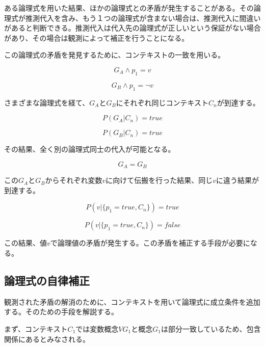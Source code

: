 \documentclass[12pt]{article}
\begin{document}
ある論理式を用いた結果、ほかの論理式との矛盾が発生することがある。その論理式が推測代入を含み、もう１つの論理式が含まない場合は、推測代入に間違いがあると判断できる。推測代入は代入先の論理式が正しいという保証がない場合があり、その場合は観測によって補正を行うことになる。

この論理式の矛盾を発見するために、コンテキストの一致を用いる。

\begin{equation} G_A \wedge p_1 = v \end{equation}

\begin{equation} G_B \wedge p_1 = \neg v \end{equation}

さまざまな論理式を経て、\(G_A\)と\(G_B\)にそれぞれ同じコンテキスト\(C_n\)が到達する。

\begin{equation} P(G_A| C_n)=true\end{equation}

\begin{equation} P(G_B|C_n)=true\end{equation}

その結果、全く別の論理式同士の代入が可能となる。

\begin{equation} G_A = G_B \end{equation}

この\(G_A\)と\(G_B\)からそれぞれ変数\(v\)に向けて伝搬を行った結果、同じ\(v\)に違う結果が到達する。

\begin{equation} P(v|\{p_1=true,C_n\})=true\end{equation}

\begin{equation} P(v|\{p_1=true,C_n\})=false\end{equation}

この結果、値\(v\)で論理値の矛盾が発生する。この矛盾を補正する手段が必要になる。

\subsection{論理式の自律補正}\label{ux8ad6ux7406ux5f0fux306eux81eaux5f8bux88dcux6b63}

観測された矛盾の解消のために、コンテキストを用いて論理式に成立条件を追加する。そのための手段を解説する。

まず、コンテキスト\(C_1\)では変数概念\(VG_{1}\)と概念\(G_{1}\)は部分一致しているため、包含関係にあるとみなされる。
\end{document}
